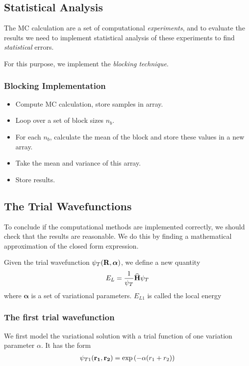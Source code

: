 \documentclass[twocolumn]{article}[12pt]
\newcommand{\eq}[1]{\begin{align*}#1\end{align*}}
\renewcommand\vec[1]{{\bf #1}}
\newcommand{\OP}[1]{{\bf\widehat{#1}}}
\begin{document}
\subsection{Statistical Analysis}
The MC calculation are a set of computational \textit{experiments}, 
and to evaluate the results 
we need to implement statistical analysis of these experiments
to find \textit{statistical} errors.

For this purpose, we implement the \textit{blocking technique}.


\subsubsection{Blocking Implementation}

\begin{itemize}
    \item Compute MC calculation, store samples in array.
    \item Loop over a set of block sizes $n_b$.
    \item For each $n_b$, calculate the mean of the block
        and store these values in a new array.
    \item Take the mean and variance of this array.
    \item Store results.
\end{itemize}

\subsection{The Trial Wavefunctions}

To conclude if the computational methods are implemented correctly,
we should check that the results are reasonable. We do this by
finding a mathematical approximation of the closed form expression.

Given the trial wavefunction $\psi_T (\vec R, \boldsymbol\alpha)$, 
we define a new quantity
{\small
\eq{
  E_L = \frac{1}{\psi_T}\OP H \psi_T
}}%
where $\boldsymbol\alpha$ is a set of variational parameters.
$E_{L1}$ is called the local energy

\subsubsection{The first trial wavefunction}
We first model the variational solution with a trial function of one
variation parameter $\alpha$. It has the form
{\small
\eq{
\psi_{T1}({\bf r_1},{\bf r_2}) = 
   \exp{\left(-\alpha(r_1+r_2)\right)}
}}%
\end{document}
